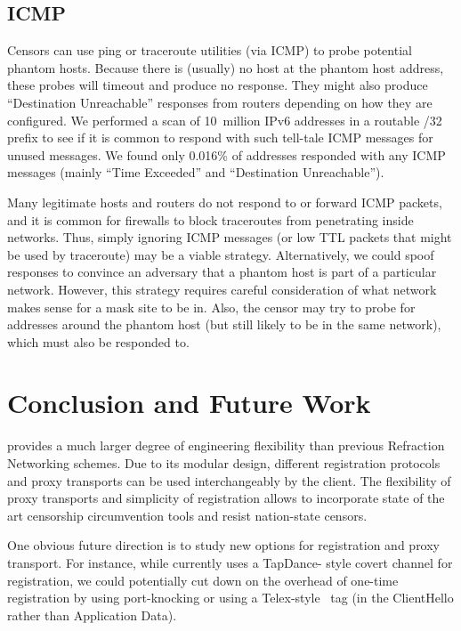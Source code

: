 \documentclass[sigconf]{acmart}
\begin{document}
\subsection{ICMP}
Censors can use ping or traceroute utilities (via ICMP) to probe potential phantom
hosts. Because there is (usually) no host at the phantom host address, these
probes will timeout and produce no response. They might also produce
``Destination Unreachable'' responses from routers depending on how they are
configured. We performed a scan of 10~million IPv6 addresses in a routable /32
prefix to see if it is common to respond with such tell-tale ICMP messages for
unused messages. We found only 0.016\% of addresses responded with any ICMP
messages (mainly ``Time Exceeded'' and ``Destination Unreachable'').

Many legitimate hosts and routers do not respond to or forward ICMP packets, and
it is common for firewalls to block traceroutes from penetrating inside
networks. Thus, simply ignoring ICMP messages (or low TTL packets that might be
used by traceroute) may be a viable strategy. %
Alternatively, we could spoof responses to convince an adversary that a 
phantom host is part of a particular network. However, this strategy requires careful
consideration of what network makes sense for a mask site to be in. Also, the
censor may try to probe for addresses around the phantom host (but still likely to
be in the same network), which must also be responded to.








\section{Conclusion and Future Work}

\scheme provides a much larger degree of engineering flexibility than previous
Refraction Networking schemes. Due to its modular design, different registration
protocols and proxy transports can be used interchangeably by the client. The
flexibility of proxy transports and simplicity of registration allows \scheme to
incorporate state of the art censorship circumvention tools and resist 
nation-state censors. 

One obvious future direction is to study new options for registration and proxy transport. For instance, while 
\scheme currently uses a TapDance- style covert channel for registration, we could potentially 
cut down on the overhead of one-time registration by using port-knocking or using a 
Telex-style~\cite{telex11} tag (in the ClientHello rather than Application Data).
\end{document}
